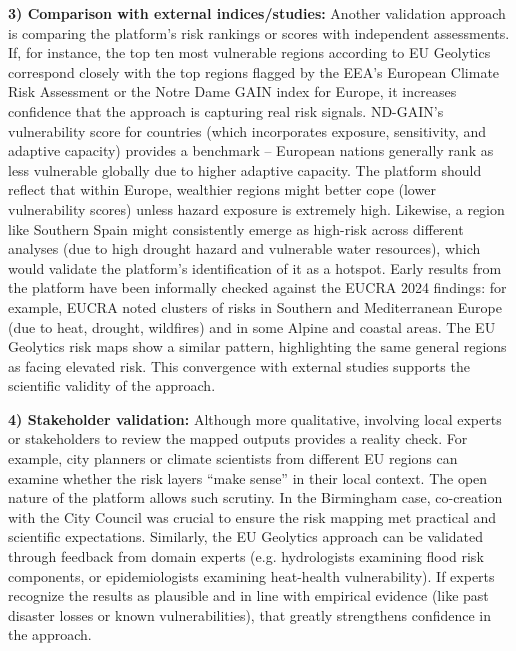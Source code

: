 \documentclass[10pt, conference]{IEEEtran}
\begin{document}
\textbf{3) Comparison with external indices/studies:} Another validation approach is comparing the platform’s risk rankings or scores with independent assessments. If, for instance, the top ten most vulnerable regions according to EU Geolytics correspond closely with the top regions flagged by the EEA’s European Climate Risk Assessment or the Notre Dame GAIN index for Europe, it increases confidence that the approach is capturing real risk signals. ND-GAIN’s vulnerability score for countries (which incorporates exposure, sensitivity, and adaptive capacity) provides a benchmark – European nations generally rank as less vulnerable globally due to higher adaptive capacity. The platform should reflect that within Europe, wealthier regions might better cope (lower vulnerability scores) unless hazard exposure is extremely high. Likewise, a region like Southern Spain might consistently emerge as high-risk across different analyses (due to high drought hazard and vulnerable water resources), which would validate the platform’s identification of it as a hotspot. Early results from the platform have been informally checked against the EUCRA 2024 findings: for example, EUCRA noted clusters of risks in Southern and Mediterranean Europe (due to heat, drought, wildfires) and in some Alpine and coastal areas. The EU Geolytics risk maps show a similar pattern, highlighting the same general regions as facing elevated risk. This convergence with external studies supports the scientific validity of the approach.

\textbf{4) Stakeholder validation:} Although more qualitative, involving local experts or stakeholders to review the mapped outputs provides a reality check. For example, city planners or climate scientists from different EU regions can examine whether the risk layers “make sense” in their local context. The open nature of the platform allows such scrutiny. In the Birmingham case, co-creation with the City Council was crucial to ensure the risk mapping met practical and scientific expectations. Similarly, the EU Geolytics approach can be validated through feedback from domain experts (e.g. hydrologists examining flood risk components, or epidemiologists examining heat-health vulnerability). If experts recognize the results as plausible and in line with empirical evidence (like past disaster losses or known vulnerabilities), that greatly strengthens confidence in the approach.
\end{document}

